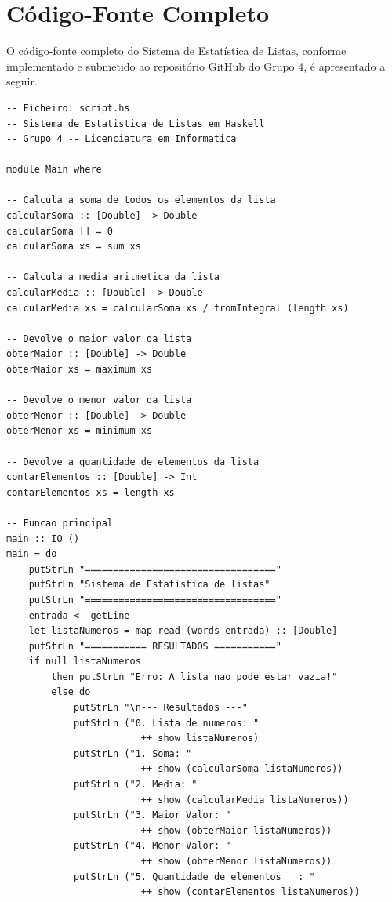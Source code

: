 \documentclass[12pt, a4paper, oneside]{report}
\begin{document}
\clearpage

\appendix
\chapter{Código-Fonte Completo}

O código-fonte completo do Sistema de Estatística de Listas, conforme implementado e submetido ao repositório GitHub do Grupo 4, é apresentado a seguir.

\begin{lstlisting}[style=haskell, caption={Código-fonte completo -- script.hs}, label=lst:apendice-codigo]
-- Ficheiro: script.hs
-- Sistema de Estatistica de Listas em Haskell
-- Grupo 4 -- Licenciatura em Informatica

module Main where

-- Calcula a soma de todos os elementos da lista
calcularSoma :: [Double] -> Double
calcularSoma [] = 0
calcularSoma xs = sum xs

-- Calcula a media aritmetica da lista
calcularMedia :: [Double] -> Double
calcularMedia xs = calcularSoma xs / fromIntegral (length xs)

-- Devolve o maior valor da lista
obterMaior :: [Double] -> Double
obterMaior xs = maximum xs

-- Devolve o menor valor da lista
obterMenor :: [Double] -> Double
obterMenor xs = minimum xs

-- Devolve a quantidade de elementos da lista
contarElementos :: [Double] -> Int
contarElementos xs = length xs

-- Funcao principal
main :: IO ()
main = do
    putStrLn "=================================="
    putStrLn "Sistema de Estatistica de listas"
    putStrLn "=================================="
    entrada <- getLine
    let listaNumeros = map read (words entrada) :: [Double]
    putStrLn "=========== RESULTADOS ==========="
    if null listaNumeros
        then putStrLn "Erro: A lista nao pode estar vazia!"
        else do
            putStrLn "\n--- Resultados ---"
            putStrLn ("0. Lista de numeros: "
                        ++ show listaNumeros)
            putStrLn ("1. Soma: "
                        ++ show (calcularSoma listaNumeros))
            putStrLn ("2. Media: "
                        ++ show (calcularMedia listaNumeros))
            putStrLn ("3. Maior Valor: "
                        ++ show (obterMaior listaNumeros))
            putStrLn ("4. Menor Valor: "
                        ++ show (obterMenor listaNumeros))
            putStrLn ("5. Quantidade de elementos   : "
                        ++ show (contarElementos listaNumeros))
\end{lstlisting}
\end{document}
